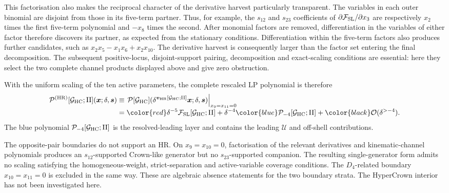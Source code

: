 \documentclass[a4paper,11pt]{article}
\newcommand{\x}{\boldsymbol{x}}
\newcommand{\s}{\boldsymbol{s}}
\newcommand{\HR}{\mathrm{HR}}
\newcommand{\SLcolour}[1]{{\color{red}#1}}
\newcommand{\HRcolour}[1]{{\color{blue}#1}}
\newcommand{\Othercolour}[1]{{\color{black}#1}}
\begin{document}
This factorisation also makes the reciprocal character of the derivative harvest
particularly transparent.  The variables in each outer binomial are disjoint
from those in its five-term partner.  Thus, for example, the \(s_{12}\) and
\(s_{23}\) coefficients of \(\partial\mathcal F_{\rm SL}/\partial x_3\)
are respectively \(x_2\) times the first five-term polynomial and \(-x_8\)
times the second.  After monomial factors are removed, differentiation in the
variables of either factor therefore discovers its partner, as expected from
the stationary conditions.  Differentiation within the five-term factors also
produces further candidates, such as
\(x_2x_5-x_1x_6+x_2x_{10}\).  The derivative harvest is consequently larger
than the factor set entering the final decomposition.  The subsequent
positive-locus, disjoint-support pairing, decomposition and exact-scaling
conditions are essential: here they select the two complete channel products
displayed above and give zero obstruction.

With the uniform scaling of the ten active parameters, the complete rescaled
LP polynomial is therefore
\begin{equation}
\begin{aligned}
 \mathcal P^{(\HR)}[\mathcal G_{\rm HC};{\rm II}](\x;\delta,\s)
 &\equiv
 \left.\mathcal P[\mathcal G_{\rm HC}]
   (\delta^{\boldsymbol v_{\HR}[\mathcal G_{\rm HC};{\rm II}]}\x;
    \delta,\s)\right|_{x_9=x_{11}=0}
 \\[-1mm]
 &=\SLcolour{\delta^{-5}\mathcal F_{\rm SL}[\mathcal G_{\rm HC};{\rm II}]}
  +\delta^{-4}\HRcolour{\mathcal P_{-4}[\mathcal G_{\rm HC};{\rm II}]}
  +\Othercolour{\mathcal O(\delta^{>-4})}.
\end{aligned}
 \label{eq:HC-type-II-decomposition}
\end{equation}
The blue polynomial \(\mathcal P_{-4}[\mathcal G_{\rm HC};{\rm II}]\)
is the resolved-leading layer and contains the leading \(\mathcal U\) and
off-shell contributions.

The opposite-pair boundaries do not support an HR.  On
\(x_9=x_{10}=0\), factorisation of the relevant derivatives and
kinematic-channel polynomials produces an \(s_{12}\)-supported Crown-like
generator but no \(s_{23}\)-supported companion.  The resulting
single-generator form admits no scaling satisfying the
homogeneous-weight, strict-separation and active-variable coverage conditions.
The \(D_4\)-related boundary \(x_{10}=x_{11}=0\) is excluded in the same way.
These are algebraic absence statements for the two boundary strata.  The
HyperCrown interior has not been investigated here.
\end{document}
